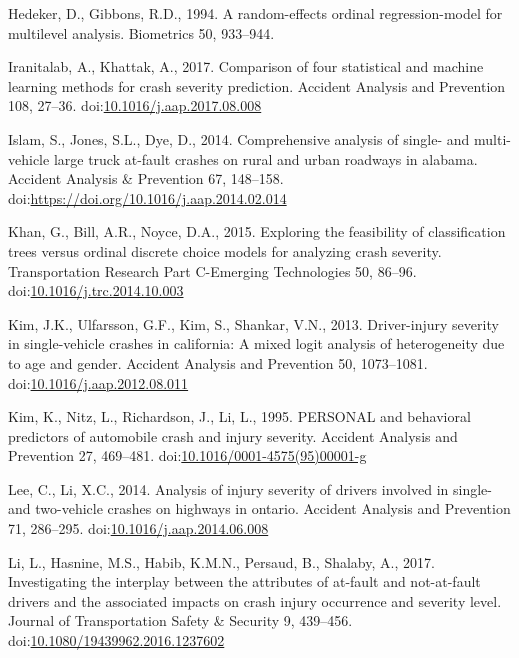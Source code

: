 \documentclass[]{elsarticle} %
\begin{document}
\leavevmode\hypertarget{ref-Hedeker1994random}{}%
Hedeker, D., Gibbons, R.D., 1994. A random-effects ordinal
regression-model for multilevel analysis. Biometrics 50, 933--944.

\leavevmode\hypertarget{ref-Iranitalab2017comparison}{}%
Iranitalab, A., Khattak, A., 2017. Comparison of four statistical and
machine learning methods for crash severity prediction. Accident
Analysis and Prevention 108, 27--36.
doi:\href{https://doi.org/10.1016/j.aap.2017.08.008}{10.1016/j.aap.2017.08.008}

\leavevmode\hypertarget{ref-Islam2014comprehensive}{}%
Islam, S., Jones, S.L., Dye, D., 2014. Comprehensive analysis of single-
and multi-vehicle large truck at-fault crashes on rural and urban
roadways in alabama. Accident Analysis \& Prevention 67, 148--158.
doi:\href{https://doi.org/https://doi.org/10.1016/j.aap.2014.02.014}{https://doi.org/10.1016/j.aap.2014.02.014}

\leavevmode\hypertarget{ref-Khan2015exploring}{}%
Khan, G., Bill, A.R., Noyce, D.A., 2015. Exploring the feasibility of
classification trees versus ordinal discrete choice models for analyzing
crash severity. Transportation Research Part C-Emerging Technologies 50,
86--96.
doi:\href{https://doi.org/10.1016/j.trc.2014.10.003}{10.1016/j.trc.2014.10.003}

\leavevmode\hypertarget{ref-Kim2013driver}{}%
Kim, J.K., Ulfarsson, G.F., Kim, S., Shankar, V.N., 2013. Driver-injury
severity in single-vehicle crashes in california: A mixed logit analysis
of heterogeneity due to age and gender. Accident Analysis and Prevention
50, 1073--1081.
doi:\href{https://doi.org/10.1016/j.aap.2012.08.011}{10.1016/j.aap.2012.08.011}

\leavevmode\hypertarget{ref-Kim1995personal}{}%
Kim, K., Nitz, L., Richardson, J., Li, L., 1995. PERSONAL and behavioral
predictors of automobile crash and injury severity. Accident Analysis
and Prevention 27, 469--481.
doi:\href{https://doi.org/10.1016/0001-4575(95)00001-g}{10.1016/0001-4575(95)00001-g}

\leavevmode\hypertarget{ref-Lee2014analysis}{}%
Lee, C., Li, X.C., 2014. Analysis of injury severity of drivers involved
in single- and two-vehicle crashes on highways in ontario. Accident
Analysis and Prevention 71, 286--295.
doi:\href{https://doi.org/10.1016/j.aap.2014.06.008}{10.1016/j.aap.2014.06.008}

\leavevmode\hypertarget{ref-Li2017interplay}{}%
Li, L., Hasnine, M.S., Habib, K.M.N., Persaud, B., Shalaby, A., 2017.
Investigating the interplay between the attributes of at-fault and
not-at-fault drivers and the associated impacts on crash injury
occurrence and severity level. Journal of Transportation Safety \&
Security 9, 439--456.
doi:\href{https://doi.org/10.1080/19439962.2016.1237602}{10.1080/19439962.2016.1237602}
\end{document}
